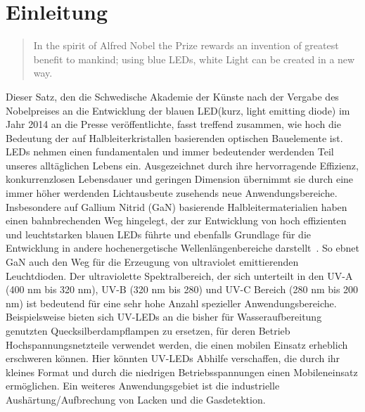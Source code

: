 
\chapter{Einleitung}
\thispagestyle{fancy}

\begin{quote}
In the spirit of Alfred Nobel the Prize rewards an invention of greatest benefit to mankind; using blue LEDs, white Light can be created in a new way.\end{quote}
Dieser Satz, den die Schwedische Akademie der Künste nach der Vergabe des Nobelpreises an die Entwicklung der blauen LED(kurz, light emitting diode) im Jahr 2014 an die Presse veröffentlichte, fasst treffend zusammen, wie hoch die Bedeutung der auf Halbleiterkristallen basierenden optischen Bauelemente ist.
LEDs nehmen einen fundamentalen und immer bedeutender werdenden Teil unseres alltäglichen Lebens ein. Ausgezeichnet durch ihre hervorragende Effizienz, konkurrenzlosen Lebensdauer und geringen Dimension übernimmt sie durch eine immer höher werdenden Lichtausbeute zusehends neue Anwendungsbereiche. 
Insbesondere auf Gallium Nitrid (GaN) basierende Halbleitermaterialien haben einen bahnbrechenden Weg hingelegt, der zur Entwicklung von hoch effizienten und leuchtstarken blauen LEDs führte und ebenfalls Grundlage für die Entwicklung in andere hochenergetische Wellenlängenbereiche darstellt~\cite{risk}.
So ebnet GaN auch den Weg für die Erzeugung von ultraviolet emittierenden Leuchtdioden. Der ultraviolette Spektralbereich, der sich unterteilt in den UV-A (400 nm bis 320 nm), UV-B (320 nm bis 280) und UV-C Bereich (280 nm bis 200 nm) ist bedeutend für eine sehr hohe Anzahl spezieller Anwendungsbereiche. Beispielsweise bieten sich UV-LEDs an die bisher für Wasseraufbereitung genutzten Quecksilberdampflampen zu ersetzen, für deren Betrieb Hochspannungsnetzteile verwendet werden, die einen mobilen Einsatz erheblich erschweren können. Hier könnten UV-LEDs Abhilfe verschaffen, die durch ihr kleines Format und durch die niedrigen Betriebsspannungen einen Mobileneinsatz ermöglichen. Ein weiteres Anwendungsgebiet ist die industrielle Aushärtung/Aufbrechung von Lacken und die Gasdetektion. 
\newline
